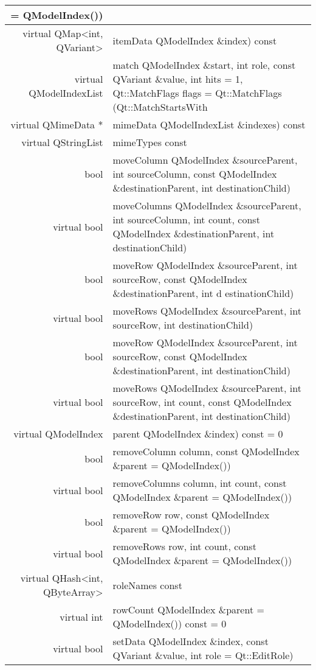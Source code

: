 \begin{longtable}{|r|l|}
              = QModelIndex())\\
\hline
virtual QMap<int, QVariant>	&itemData QModelIndex \&index) const\\
\hline
virtual QModelIndexList	& match QModelIndex \&start, int role, const QVariant \&value, int hits = 1, Qt::MatchFlags flags = Qt::MatchFlags (Qt::MatchStartsWith\\
\hline
virtual QMimeData *	&mimeData QModelIndexList \&indexes) const\\
\hline
virtual QStringList	& mimeTypes const\\
\hline
bool	&moveColumn QModelIndex \&sourceParent, int sourceColumn,
       const QModelIndex \&destinationParent, int destinationChild)\\
\hline
virtual bool & moveColumns QModelIndex \&sourceParent, int
               sourceColumn, int count, const QModelIndex
               \&destinationParent, int destinationChild)\\
\hline
bool& moveRow QModelIndex \&sourceParent, int sourceRow, const QModelIndex \&destinationParent, int d
estinationChild)\\
\hline
virtual bool &moveRows QModelIndex \&sourceParent, int sourceRow, int destinationChild)\\
\hline
bool &moveRow QModelIndex \&sourceParent, int sourceRow, 
       const QModelIndex \&destinationParent, 
       int destinationChild)\\    
\hline           
virtual bool &moveRows QModelIndex \&sourceParent, int sourceRow, 
               int count, const QModelIndex \&destinationParent, int destinationChild)\\
\hline
virtual QModelIndex&	parent QModelIndex \&index) const = 0\\
\hline
bool&	removeColumn column, const QModelIndex \&parent = QModelIndex())\\
\hline
virtual bool&	removeColumns column, int count, const QModelIndex \&parent = QModelIndex())\\
\hline
bool&	removeRow row, const QModelIndex \&parent = QModelIndex())\\
\hline
virtual bool&	removeRows row, int count, const QModelIndex \&parent = QModelIndex())\\
\hline
virtual QHash<int, QByteArray>&	roleNames const\\
\hline
virtual int	& rowCount QModelIndex \&parent = QModelIndex()) const = 0\\
\hline
virtual bool &setData QModelIndex \&index, const QVariant \&value, int role = Qt::EditRole)\\

\end{longtable}
